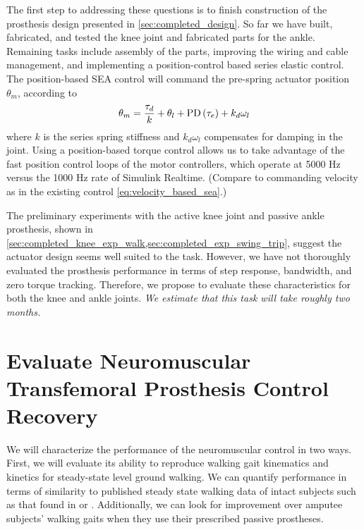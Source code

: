 The first step to addressing these questions is to finish construction of the
prosthesis design presented in \cref{sec:completed_design}. So far we have
built, fabricated, and tested the knee joint and fabricated parts for the ankle.
Remaining tasks include assembly of the parts, improving the wiring and cable
management, and implementing a position-control based series elastic control.
The position-based SEA control will command the pre-spring actuator position
$\theta_m$, according to
\begin{align}
    \theta_m = \frac{\tau_d}{k} + \theta_l + \func{PD}{\tau_e} + k_d \omega_l
\end{align}
where $k$ is the series spring stiffness and $k_d \omega_l$ compensates for
damping in the joint. Using a position-based torque control allows us to take
advantage of the fast position control loops of the motor controllers, 
which operate at 5000 Hz versus the 1000 Hz rate of Simulink Realtime. (Compare
to commanding velocity as in the existing control \cref{eq:velocity_based_sea}.)

The preliminary experiments with the active knee joint and passive ankle
prosthesis, shown in
\cref{sec:completed_knee_exp_walk,sec:completed_exp_swing_trip}, suggest the
actuator design seems well suited to the task. However, we have not thoroughly
evaluated the prosthesis performance in terms of step response, bandwidth, and
zero torque tracking. Therefore, we propose to evaluate these characteristics
for both the knee and ankle joints. \emph{We estimate that this task will take
roughly two months.}

\section{Evaluate Neuromuscular Transfemoral Prosthesis
Control Recovery}\label{sec:proposed_evaluate}

We will characterize the performance of the neuromuscular control in two ways.
First, we will evaluate its ability to reproduce walking gait kinematics and
kinetics for steady-state level ground walking. We can quantify performance
in terms of similarity to published steady state walking data of intact subjects
such as that found in \citet{winter2009biomechanics} or \citet{perry2010gait}.
Additionally, we can look for improvement over amputee subjects' walking gaits
when they use their prescribed passive prostheses.

